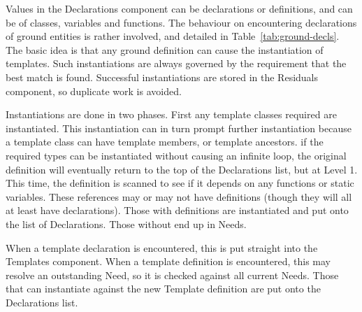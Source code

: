 \documentclass[11pt]{article}
\begin{document}
Values in the Declarations component can be declarations or
definitions, and can be of classes, variables and functions.  The
behaviour on encountering declarations of ground entities is rather
involved, and detailed in Table~\ref{tab:ground-decls}.  The basic
idea is that any ground definition can cause the instantiation of
templates.  Such instantiations are always governed by the requirement
that the best match is found.  Successful instantiations are stored in
the Residuals component, so duplicate work is avoided.

Instantiations are done in two phases.  First any template classes
required are instantiated.  This instantiation can in turn prompt
further instantiation because a template class can have template
members, or template ancestors.  if the required types can be
instantiated without causing an infinite loop, the original definition
will eventually return to the top of the Declarations list, but at
Level 1.  This time, the definition is scanned to see if it depends on
any functions or static variables.   These references may or may not
have definitions (though they will all at least have declarations).
Those with definitions are instantiated and put onto the list of
Declarations.  Those without end up in Needs.

When a template declaration is encountered, this is put straight into
the Templates component.  When a template definition is encountered,
this may resolve an outstanding Need, so it is checked against all
current Needs.  Those that can instantiate against the new Template
definition are put onto the Declarations list.
\end{document}
